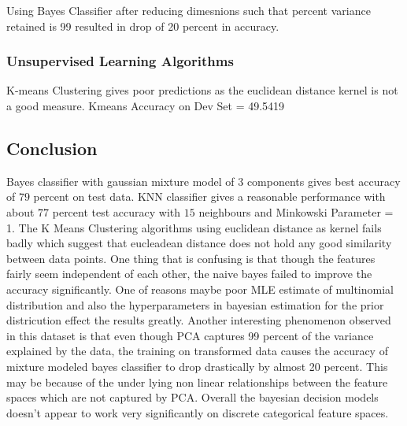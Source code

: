 \documentclass[12pt,journal,compsoc]{IEEEtran}
\begin{document}
\noindent Using Bayes Classifier after reducing dimesnions such that percent variance retained is 99 resulted in drop of 20 percent in accuracy. 

\subsubsection{Unsupervised Learning Algorithms}

\noindent K-means Clustering gives poor predictions as the euclidean distance kernel is not a good measure. Kmeans Accuracy on Dev Set =  49.5419

\pagebreak
\subsection{Conclusion}
\noindent Bayes classifier with gaussian mixture model of 3 components gives best accuracy of  $79$ percent on test data. KNN classifier gives a reasonable performance with about $77$ percent test accuracy with $15$ neighbours and Minkowski Parameter = 1. The K Means Clustering algorithms using euclidean distance as kernel fails badly which suggest that eucleadean distance does not hold any good similarity between data points. One thing that is confusing is that though the features fairly seem independent of each other, the naive bayes failed to improve the accuracy significantly. One of reasons maybe poor MLE estimate of multinomial distribution and also the hyperparameters in bayesian estimation for the prior districution effect the results greatly. Another interesting phenomenon observed in this dataset is that even though PCA captures 99 percent of the variance explained by the data, the training on transformed data causes the accuracy of mixture modeled bayes classifier to drop drastically by almost 20 percent. This may be because of the under lying non linear relationships between the feature spaces which are not captured by PCA. Overall the bayesian decision models doesn’t appear to work very significantly on discrete categorical feature spaces.
\end{document}
